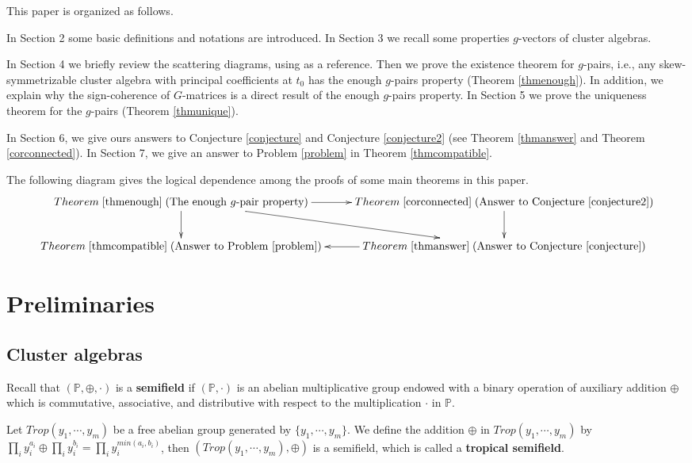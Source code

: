 \documentclass[14pt]{amsart}
\begin{document}
This paper is organized as follows.

In Section 2 some basic definitions and notations are introduced.
In Section 3 we recall some properties $g$-vectors of  cluster algebras.


In Section 4  we briefly review the scattering diagrams, using \cite{M} as a reference. Then we prove the existence theorem for $g$-pairs, i.e., any skew-symmetrizable cluster algebra with principal coefficients at $t_0$ has  the enough $g$-pairs property  (Theorem \ref{thmenough}). In addition, we explain why the sign-coherence of $G$-matrices is a direct result of  the enough $g$-pairs property. In Section 5 we prove the uniqueness theorem for the $g$-pairs (Theorem \ref{thmunique}).



In Section 6, we give ours answers to  Conjecture \ref{conjecture} and Conjecture \ref{conjecture2} (see Theorem \ref{thmanswer} and Theorem \ref{corconnected}).
In Section 7, we give an answer to Problem \ref{problem} in Theorem \ref{thmcompatible}.

 The following diagram gives  the logical dependence among the proofs of some main theorems in this paper.
$$
\begin{array}{ccc}
\xymatrix{Theorem\; \ref{thmenough}\; (\text{The enough $g$-pair property})\ar[r]\ar[d]\ar[rd]&Theorem \;\ref{corconnected}\; (\text{Answer to Conjecture \ref{conjecture2}})\ar[d]
\\
Theorem\; \ref{thmcompatible}\;(\text{Answer to Problem \ref{problem}})&Theorem \;\ref{thmanswer}\;(\text{Answer to Conjecture \ref{conjecture}}\ar[l])
}
\end{array}
$$
\vspace{5mm}

\section{Preliminaries}

\subsection{Cluster algebras}
Recall that $(\mathbb P, \oplus, \cdot)$ is a {\bf semifield } if $(\mathbb P,  \cdot)$ is an abelian multiplicative group endowed with a binary operation of auxiliary addition $\oplus$ which is commutative, associative, and distributive with respect to the multiplication $\cdot$ in $\mathbb P$.

Let $Trop(y_1,\cdots,y_m)$ be a free abelian group generated by $\{y_1,\cdots,y_m\}$. We define the addition $\oplus$ in $Trop(y_1,\cdots,y_m)$ by $\prod\limits_{i}y_i^{a_i}\oplus\prod\limits_{i}y_i^{b_i}=\prod\limits_{i}y_i^{min(a_i,b_i)}$, then $(Trop(y_1,\cdots,y_m), \oplus)$ is a semifield, which is called a {\bf tropical semifield}.
\end{document}
